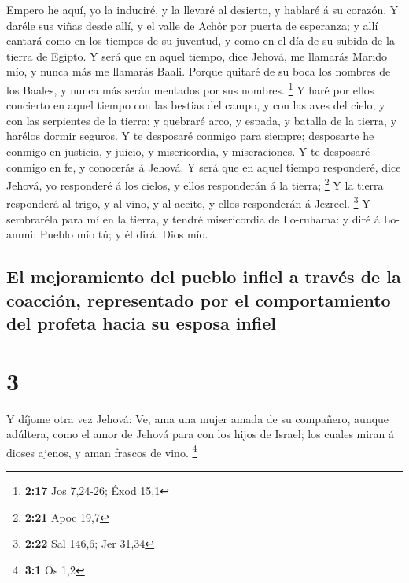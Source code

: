  Empero he aquí, yo la induciré, y la llevaré al desierto,
y hablaré á su corazón.  Y daréle sus viñas desde allí, y
el valle de Achôr por puerta de esperanza; y allí cantará como en los
tiempos de su juventud, y como en el día de su subida de la tierra de
Egipto.  Y será que en aquel tiempo, dice Jehová, me
llamarás Marido mío, y nunca más me llamarás Baali.  Porque
quitaré de su boca los nombres de los Baales, y nunca más serán mentados
por sus nombres. \footnote{\textbf{2:17} Jos 7,24-26; Éxod 15,1}
 Y haré por ellos concierto en aquel tiempo con las bestias
del campo, y con las aves del cielo, y con las serpientes de la tierra:
y quebraré arco, y espada, y batalla de la tierra, y harélos dormir
seguros.  Y te desposaré conmigo para siempre; desposarte
he conmigo en justicia, y juicio, y misericordia, y miseraciones.
 Y te desposaré conmigo en fe, y conocerás á Jehová.
 Y será que en aquel tiempo responderé, dice Jehová, yo
responderé á los cielos, y ellos responderán á la tierra; \footnote{\textbf{2:21}
  Apoc 19,7}  Y la tierra responderá al trigo, y al vino, y
al aceite, y ellos responderán á Jezreel. \footnote{\textbf{2:22} Sal
  146,6; Jer 31,34}  Y sembraréla para mí en la tierra, y
tendré misericordia de Lo-ruhama: y diré á Lo-ammi: Pueblo mío tú; y él
dirá: Dios mío.

\hypertarget{el-mejoramiento-del-pueblo-infiel-a-travuxe9s-de-la-coacciuxf3n-representado-por-el-comportamiento-del-profeta-hacia-su-esposa-infiel}{%
\subsection{El mejoramiento del pueblo infiel a través de la coacción,
representado por el comportamiento del profeta hacia su esposa
infiel}\label{el-mejoramiento-del-pueblo-infiel-a-travuxe9s-de-la-coacciuxf3n-representado-por-el-comportamiento-del-profeta-hacia-su-esposa-infiel}}

\hypertarget{section-2}{%
\section{3}\label{section-2}}

 Y díjome otra vez Jehová: Ve, ama una mujer amada de su
compañero, aunque adúltera, como el amor de Jehová para con los hijos de
Israel; los cuales miran á dioses ajenos, y aman frascos de vino.
\footnote{\textbf{3:1} Os 1,2}


